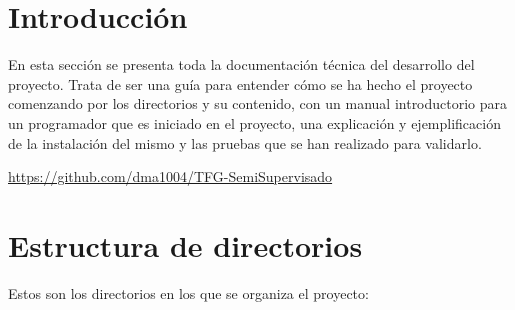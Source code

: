 
\section{Introducción}
En esta sección se presenta toda la documentación técnica del desarrollo del
proyecto. Trata de ser una guía para entender cómo se ha hecho el proyecto
comenzando por los directorios y su contenido, con un manual introductorio para
un programador que es iniciado en el proyecto, una explicación y ejemplificación de la
instalación del mismo y las pruebas que se han realizado para validarlo.

\begin{tcolorbox}[enhanced,title=Repositorio Github,
frame style={left color=blue!75!black,
right color=cyan!75!black}]
\url{https://github.com/dma1004/TFG-SemiSupervisado}
\end{tcolorbox}

\section{Estructura de directorios}
Estos son los directorios en los que se organiza el proyecto:

